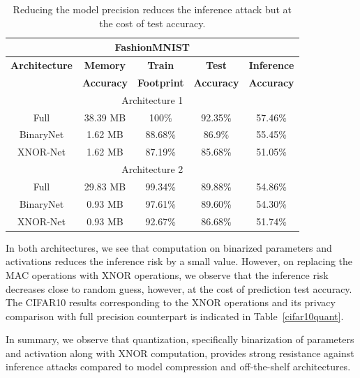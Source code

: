 \begin{table}[!htb]
\begin{center}
\renewcommand\arraystretch{1.5}
\fontsize{6.5pt}{6.5pt}\selectfont
\begin{tabular}{|c|c|c|c|c|}
\hline
\multicolumn{5}{|c|}{\textbf{FashionMNIST}}\\
\hline
\textbf{Architecture} & \textbf{Memory} & \textbf{Train}  & \textbf{Test}  & \textbf{Inference}  \\
 & \textbf{Accuracy} &  \textbf{Footprint} & \textbf{Accuracy} & \textbf{Accuracy}  \\
\hline
\multicolumn{5}{|c|}{Architecture 1}\\
Full & 38.39 MB & 100\% & 92.35\% & \cellcolor{red!25}57.46\%\\
BinaryNet & 1.62 MB & 88.68\% & 86.9\% & \cellcolor{green!25}55.45\%\\
XNOR-Net & 1.62 MB & 87.19\% & 85.68\% & \cellcolor{green!25}51.05\%\\ %
\hline
\multicolumn{5}{|c|}{Architecture 2}\\
Full & 29.83 MB & 99.34\% & 89.88\% & \cellcolor{red!25}54.86\% \\
BinaryNet & 0.93 MB & 97.61\% & 89.60\% & \cellcolor{green!25}54.30\%\\
XNOR-Net & 0.93 MB & 92.67\% & 86.68\% & \cellcolor{green!25}51.74\%\\ %
\hline
\end{tabular}
\end{center}
\caption{Reducing the model precision reduces the inference attack but at the cost of test accuracy.}
\label{fmnist_quantize}
\vspace{-2mm}
\end{table}

In both architectures, we see that computation on  binarized parameters and activations reduces the inference risk by a small value.
However, on replacing the MAC operations with XNOR operations, we observe that the inference risk decreases close to random guess, however, at the cost of prediction test accuracy.
The CIFAR10 results corresponding to the XNOR operations and its privacy comparison with full precision counterpart is indicated in Table~\ref{cifar10quant}.

In summary, we observe that quantization, specifically binarization of parameters and activation along with XNOR computation, provides strong resistance against inference attacks compared to model compression and off-the-shelf architectures.


